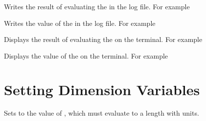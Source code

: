 \documentclass[oneside]{book}
\begin{document}
\begin{function}{\DimLog}
\begin{syntax}
 
\end{syntax}
Writes the result of evaluating the 
in the log file. For example
\begin{codehigh}
\DimLog {\lFooSomeDim+1cm}
\end{codehigh}
\end{function}

\begin{function}{\DimVarLog}
\begin{syntax}
 
\end{syntax}
Writes the value of the  in the log file. For example
\begin{codehigh}
\DimVarLog \lFooSomeDim
\end{codehigh}
\end{function}

\begin{function}{\DimShow}
\begin{syntax}
 
\end{syntax}
Displays the result of evaluating the 
on the terminal. For example
\begin{codehigh}
\DimShow {\lFooSomeDim+1cm}
\end{codehigh}
\end{function}

\begin{function}{\DimVarShow}
\begin{syntax}
 
\end{syntax}
Displays the value of the  on the terminal. For example
\begin{codehigh}
\DimVarShow \lFooSomeDim
\end{codehigh}
\end{function}

\section{Setting Dimension Variables}

\begin{function}{\DimSet}
\begin{syntax}
  
\end{syntax}
Sets  to the value of , which
must evaluate to a length with units.
\end{function}
\end{document}
